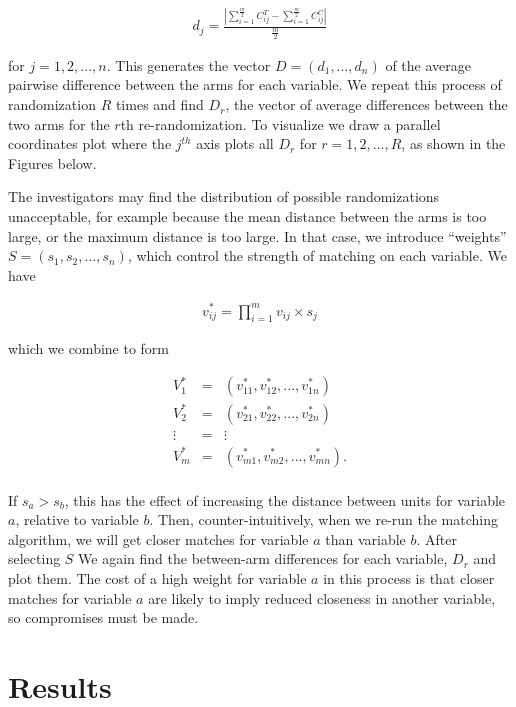 \documentclass[]{article}
\begin{document}
\begin{eqnarray*}
 d_j = \frac{| \sum_{i = 1}^{\frac{m}{2}}C_{ij}^T - \sum_{i = 1}^{\frac{m}{2}}C_{ij}^C |}{\frac{m}{2}} 
\end{eqnarray*}

for \(j = 1, 2, ..., n.\) This generates the vector
\(D = (d_1, \ldots, d_n)\) of the average pairwise difference between
the arms for each variable. We repeat this process of randomization
\(R\) times and find \(D_r\), the vector of average differences between
the two arms for the \(r\)th re-randomization. To visualize we draw a
parallel coordinates plot where the \(j^{th}\) axis plots all \(D_r\)
for \(r = 1, 2, ..., R\), as shown in the Figures below.

The investigators may find the distribution of possible randomizations
unacceptable, for example because the mean distance between the arms is
too large, or the maximum distance is too large. In that case, we
introduce ``weights'' \(S = (s_{1}, s_{2},..., s_{n})\), which control
the strength of matching on each variable. We have

\begin{eqnarray*}
 v_{ij}^* = \prod_{i=1}^{m} v_{ij} \times s_j
\end{eqnarray*}

which we combine to form

\begin{eqnarray*}
 V_1^* & = & (v_{11}^*, v_{12}^*,..., v_{1n}^*) \\
 V_2^* & = & (v_{21}^*, v_{22}^*,..., v_{2n}^*) \\
 \vdots & = & \vdots\\    
 V_m^* & = & (v_{m1}^*, v_{m2}^*,..., v_{mn}^*) .\\
\end{eqnarray*}

If \(s_a > s_b\), this has the effect of increasing the distance between
units for variable \(a\), relative to variable \(b\). Then,
counter-intuitively, when we re-run the matching algorithm, we will get
closer matches for variable \(a\) than variable \(b\). After selecting
\(S\) We again find the between-arm differences for each variable,
\(D_r\) and plot them. The cost of a high weight for variable \(a\) in
this process is that closer matches for variable \(a\) are likely to
imply reduced closeness in another variable, so compromises must be
made.

\section{Results}\label{results}
\end{document}
